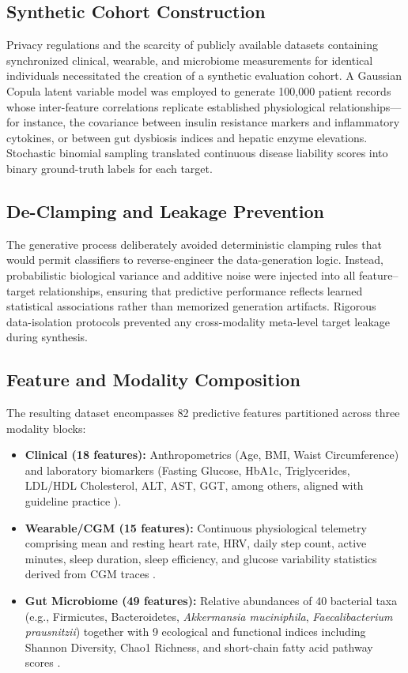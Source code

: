 \documentclass[10pt,twocolumn,letterpaper]{article}
\begin{document}
\subsection{Synthetic Cohort Construction}
Privacy regulations and the scarcity of publicly available datasets containing synchronized clinical, wearable, and microbiome measurements for identical individuals necessitated the creation of a synthetic evaluation cohort. A Gaussian Copula latent variable model \citep{xu2015sdv} was employed to generate 100{,}000 patient records whose inter-feature correlations replicate established physiological relationships---for instance, the covariance between insulin resistance markers and inflammatory cytokines, or between gut dysbiosis indices and hepatic enzyme elevations. Stochastic binomial sampling translated continuous disease liability scores into binary ground-truth labels for each target.

\subsection{De-Clamping and Leakage Prevention}
The generative process deliberately avoided deterministic clamping rules that would permit classifiers to reverse-engineer the data-generation logic. Instead, probabilistic biological variance and additive noise were injected into all feature--target relationships, ensuring that predictive performance reflects learned statistical associations rather than memorized generation artifacts. Rigorous data-isolation protocols prevented any cross-modality meta-level target leakage during synthesis.

\subsection{Feature and Modality Composition}
The resulting dataset encompasses 82 predictive features partitioned across three modality blocks:
\begin{itemize}
    \item \textbf{Clinical (18 features):} Anthropometrics (Age, BMI, Waist Circumference) and laboratory biomarkers (Fasting Glucose, HbA1c, Triglycerides, LDL/HDL Cholesterol, ALT, AST, GGT, among others, aligned with guideline practice \citep{ada2024standards, whelton2018acc, rinella2023aasld}).
    \item \textbf{Wearable/CGM (15 features):} Continuous physiological telemetry comprising mean and resting heart rate, HRV, daily step count, active minutes, sleep duration, sleep efficiency, and glucose variability statistics derived from CGM traces \citep{hall2018glucotypes, dunn2021wearable, battelino2019clinical}.
    \item \textbf{Gut Microbiome (49 features):} Relative abundances of 40 bacterial taxa (e.g., Firmicutes, Bacteroidetes, \textit{Akkermansia muciniphila}, \textit{Faecalibacterium prausnitzii}) together with 9 ecological and functional indices including Shannon Diversity, Chao1 Richness, and short-chain fatty acid pathway scores \citep{qin2012metagenome, cani2019supplementation}.
\end{itemize}
\end{document}
